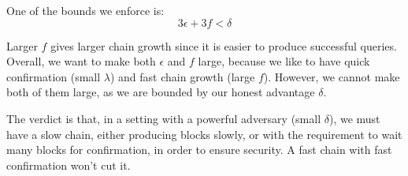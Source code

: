 One of the bounds we enforce is:
$$3\epsilon + 3f < \delta$$

Larger $f$ gives larger chain growth since it is easier to produce successful queries. Overall, we want to make both $\epsilon$ and $f$ large, because we like to have quick confirmation (small $\lambda$) and fast chain growth (large $f$). However, we cannot make both of them large, as we are bounded by our honest advantage $\delta$.

The verdict is that, in a setting with a powerful adversary (small $\delta$), we must have a slow chain, either producing blocks slowly, or with the requirement to wait many blocks for confirmation, in order to ensure security. A fast chain with fast confirmation won't cut it.
